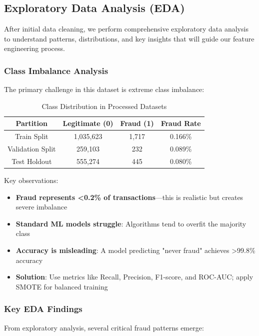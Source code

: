 \subsection{Exploratory Data Analysis (EDA)}

After initial data cleaning, we perform comprehensive exploratory data analysis to understand patterns, distributions, and key insights that will guide our feature engineering process.

\subsubsection{Class Imbalance Analysis}

The primary challenge in this dataset is extreme class imbalance:

\begin{table}[h]
\centering
\caption{Class Distribution in Processed Datasets}
\begin{tabular}{|c|c|c|c|}
\hline
\textbf{Partition} & \textbf{Legitimate (0)} & \textbf{Fraud (1)} & \textbf{Fraud Rate} \\
\hline
Train Split & 1,035,623 & 1,717 & 0.166\% \\
\hline
Validation Split & 259,103 & 232 & 0.089\% \\
\hline
Test Holdout & 555,274 & 445 & 0.080\% \\
\hline
\end{tabular}
\end{table}

Key observations:
\begin{itemize}
    \item \textbf{Fraud represents <0.2\% of transactions}---this is realistic but creates severe imbalance
    \item \textbf{Standard ML models struggle}: Algorithms tend to overfit the majority class
    \item \textbf{Accuracy is misleading}: A model predicting "never fraud" achieves >99.8\% accuracy
    \item \textbf{Solution}: Use metrics like Recall, Precision, F1-score, and ROC-AUC; apply SMOTE for balanced training
\end{itemize}

\subsubsection{Key EDA Findings}

From exploratory analysis, several critical fraud patterns emerge:

